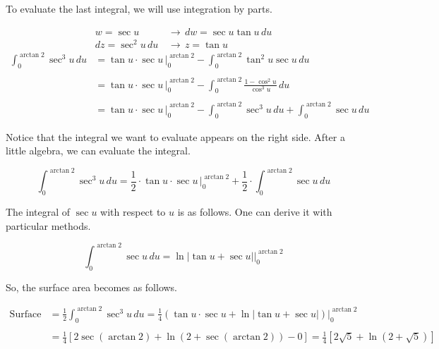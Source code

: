 \documentclass{article}
\begin{document}
\hfill

\noindent To evaluate the last integral, we will use integration by parts.

\begin{align*}
    w=\sec u\,&\rightarrow\, dw = \sec u\tan u \,du\\
    dz=\sec^2u\,du\,&\rightarrow\, z = \tan u
\end{align*}
\begin{align*}
\int_0^{\arctan2}\sec^3u\,du&=\tan u \cdot \sec u\,\bigg|_0^{\arctan2} -\int_0^{\arctan2} \tan^2 u\sec u\, du\\\\&= \tan u \cdot \sec u\,\bigg|_0^{\arctan2} -\int_0^{\arctan2} \frac{1-\cos^2u}{\cos^3 u}\, du\\\\&= \tan u \cdot \sec u\,\bigg|_0^{\arctan2} - \int_0^{\arctan2} \sec^3u \, du + \int_0^{\arctan2} \sec u \, du 
\end{align*}

\hfill

\noindent Notice that the integral we want to evaluate appears on the right side. After a little algebra, we can evaluate the integral.

\begin{equation*}
\int_0^{\arctan2}\sec^3u\,du=\frac12\cdot\tan u\cdot\sec u\,\bigg|_0^{\arctan2}+\frac12\cdot\int_0^{\arctan2}\sec u\,du
\end{equation*}

\hfill

\noindent The integral of $\sec u$ with respect to $u$ is as follows. One can derive it with particular methods.

\begin{equation*}\int_0^{\arctan2}\sec u \, du = \ln\left|\tan u + \sec u\right|\bigg|_0^{\arctan2}
\end{equation*}

\hfill

\noindent So, the surface area becomes as follows.

\begin{align*}\text{Surface area}&=\frac12\int_0^{\arctan2}\sec^3u\,du=\frac14\left(\tan u\cdot\sec u+\ln\left|\tan u+\sec u\right|\right)\bigg|_0^{\arctan2}\\\\&=\frac14\left[2\sec(\arctan2)+ \ln(2+\sec(\arctan2))-0\right]=\boxed{\frac14\left[2\sqrt5+\ln\left(2+\sqrt5\right)\right]}\end{align*}
\end{document}
